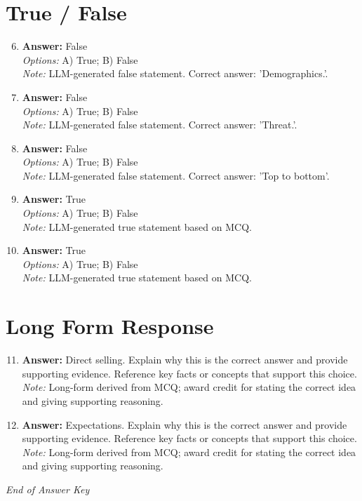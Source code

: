 \documentclass[12pt]{article}
\begin{document}
\section*{True / False}
\begin{enumerate}[label=\arabic*.]
\setcounter{enumi}{5}
\item \textbf{Answer:} False
\\ \textit{Options:} A) True; B) False
\\ \textit{Note:} LLM-generated false statement. Correct answer: 'Demographics.'.
\item \textbf{Answer:} False
\\ \textit{Options:} A) True; B) False
\\ \textit{Note:} LLM-generated false statement. Correct answer: 'Threat.'.
\item \textbf{Answer:} False
\\ \textit{Options:} A) True; B) False
\\ \textit{Note:} LLM-generated false statement. Correct answer: 'Top to bottom'.
\item \textbf{Answer:} True
\\ \textit{Options:} A) True; B) False
\\ \textit{Note:} LLM-generated true statement based on MCQ.
\item \textbf{Answer:} True
\\ \textit{Options:} A) True; B) False
\\ \textit{Note:} LLM-generated true statement based on MCQ.
\end{enumerate}

\section*{Long Form Response}
\begin{enumerate}[label=\arabic*.]
\setcounter{enumi}{10}
\item \textbf{Answer:} Direct selling. Explain why this is the correct answer and provide supporting evidence. Reference key facts or concepts that support this choice.
\\ \textit{Note:} Long-form derived from MCQ; award credit for stating the correct idea and giving supporting reasoning.
\item \textbf{Answer:} Expectations. Explain why this is the correct answer and provide supporting evidence. Reference key facts or concepts that support this choice.
\\ \textit{Note:} Long-form derived from MCQ; award credit for stating the correct idea and giving supporting reasoning.
\end{enumerate}

\vfill
\noindent\textit{End of Answer Key}
\end{document}
